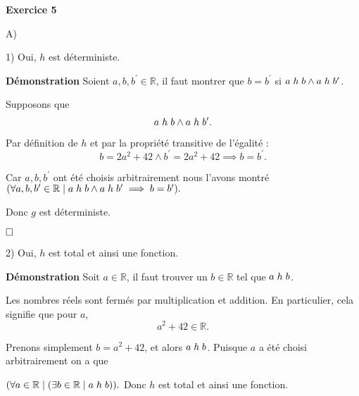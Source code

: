 \documentclass{article}
\begin{document}
\textbf{Exercice 5}

\vspace{0.5cm}

A)

1) Oui, $h$ est déterministe.

\textbf{Démonstration} Soient $a, b, b^{\prime} \in \mathbb{R}$, il faut montrer que $b = b^{\prime}$ si $a \hspace{.1cm} h \hspace{.1cm} b \land a \hspace{.1cm} h \hspace{.1cm} b^{\prime}$.

Supposons que  
$$ a \hspace{.1cm} h \hspace{.1cm} b \land a \hspace{.1cm} h \hspace{.1cm} b^{\prime}. $$

Par définition de $h$ et par la propriété transitive de l'égalité :
$$ b = 2a^2 + 42 \land b^{\prime} = 2a^2 + 42 \implies b = b^{\prime}. $$

Car $a, b, b^{\prime}$ ont été choisis arbitrairement nous l'avons montré $ ( \forall a, b, b^{\prime} \in \mathbb{R} \mid a \hspace{.1cm} h \hspace{.1cm} b \land a \hspace{.1cm} h \hspace{.1cm} b^{\prime} \implies b = b^{\prime}). $

Donc $g$ est déterministe. 

$\hfill \square$

2) Oui, $h$ est total et ainsi une fonction.

\textbf{Démonstration} Soit $a \in \mathbb{R}$, il faut trouver un $b \in \mathbb{R}$ tel que $a \hspace{.1cm} h \hspace{.1cm} b$.

Les nombres réels sont fermés par multiplication et addition. En particulier, cela signifie que pour $a$, 
$$ a^2 + 42  \in \mathbb{R}. $$

Prenons simplement $b = a^2 + 42$, et alors $a \hspace{.1cm} h \hspace{.1cm} b$. Puisque $a$ a été choisi arbitrairement on a que

$( \forall a \in \mathbb{R} \mid ( \exists b \in \mathbb{R} \mid a \hspace{.1cm} h \hspace{.1cm} b ) ).$ Donc $h$ est total et ainsi une fonction.
\end{document}
